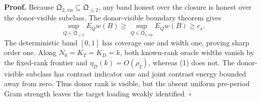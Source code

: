\textbf{Proof.}
Because \(\mathfrak Q_{2,\mathrm{vis}}\subseteq\mathfrak Q_{\le2}\), any band honest over the closure is honest over the donor-visible subclass. The donor-visible boundary theorem gives
\[
 \sup_{Q\in\mathfrak Q_{\le2}}E_Qw(B)
 \ge\sup_{Q\in\mathfrak Q_{2,\mathrm{vis}}}E_Qw(B)
 \ge c_\star.                                            \tag{1}
\]
The deterministic band \([0,1]\) has coverage one and width one, proving sharp order one. Along \(N_0=K_T=K_D=k\), both known-rank oracle widths vanish by the fixed-rank frontier and \(\eta_D(k)=O(\rho_2)\), whereas (1) does not. The donor-visible subclass has contrast indicator one and joint contrast energy bounded away from zero. Thus donor rank is visible, but the absent uniform pre-period Gram strength leaves the target loading weakly identified. \(\square\)
